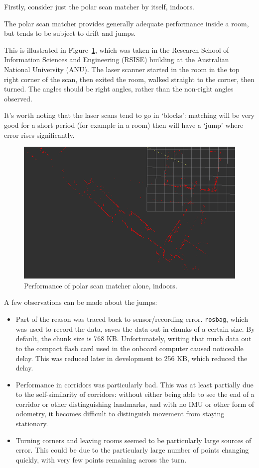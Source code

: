 \documentclass[12pt,oneside,a4paper]{book}
\begin{document}
Firstly, consider just the polar scan matcher by itself, indoors.

The polar scan matcher provides generally adequate performance inside
a room, but tends to be subject to drift and jumps. 

This is illustrated in Figure~\ref{fig:psm-indoors}, which was taken
in the Research School of Information Sciences and Engineering (RSISE)
building at the Australian National University (ANU). The laser scanner
started in the room in the top right corner of the scan, then exited
the room, walked straight to the corner, then turned. The angles
should be right angles, rather than the non-right angles observed.

It's worth noting that the laser scans tend to go in `blocks':
matching will be very good for a short period (for example in a room)
then will have a `jump' where error rises significantly.

\begin{figure}[h!]
  \centering
  \includegraphics[width=\textwidth]{figs/indoor}
  \caption{Performance of polar scan matcher alone, indoors.}
  \label{fig:psm-indoors}
\end{figure}
\newpage
A few observations can be made about the jumps:
\begin{itemize}
\item Part of the reason was traced back to sensor/recording
  error. \texttt{rosbag}, which was used to record the data, saves the
  data out in chunks of a certain size. By default, the chunk size is
  768 KB. Unfortunately, writing that much data out to the compact
  flash card used in the onboard computer caused noticeable
  delay. This was reduced later in development to 256 KB, which
  reduced the delay.
\item Performance in corridors was particularly bad. This was at least
  partially due to the self-similarity of corridors: without either
  being able to see the end of a corridor or other distinguishing
  landmarks, and with no IMU or other form of odometry, it becomes
  difficult to distinguish movement from staying stationary.
\item Turning corners and leaving rooms seemed to be particularly
  large sources of error. This could be due to the particularly large
  number of points changing quickly, with very few points remaining
  across the turn.
\end{itemize}
\end{document}
